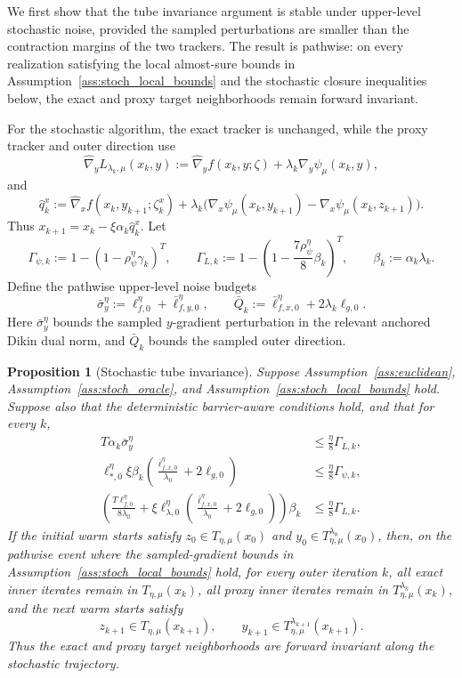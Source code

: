 \documentclass{article}
\newtheorem{proposition}{Proposition}
\begin{document}
We first show that the tube invariance argument is stable under upper-level stochastic noise, provided
the sampled perturbations are smaller than the contraction margins of the two trackers. The result is
pathwise: on every realization satisfying the local almost-sure bounds in
Assumption~\ref{ass:stoch_local_bounds} and the stochastic closure inequalities below, the exact and
proxy target neighborhoods remain forward invariant.

For the stochastic algorithm, the exact tracker is unchanged, while the proxy tracker and outer
direction use
\[
\widehat\nabla_y L_{\lambda_k,\mu}(x_k,y)
:=
\widehat\nabla_y f(x_k,y;\zeta)
+
\lambda_k\nabla_y\psi_\mu(x_k,y),
\]
and
\[
\widehat q_k^x
:=
\widehat\nabla_x f(x_k,y_{k+1};\zeta_k^x)
+
\lambda_k
\bigl(
\nabla_x\psi_\mu(x_k,y_{k+1})
-
\nabla_x\psi_\mu(x_k,z_{k+1})
\bigr).
\]
Thus \(x_{k+1}=x_k-\xi\alpha_k\widehat q_k^x\). Let
\[
\Gamma_{\psi,k}
:=
1-(1-\rho_\psi^\eta\gamma_k)^T,
\qquad
\Gamma_{L,k}
:=
1-\left(1-\frac{7\rho_\psi^\eta}{8}\beta_k\right)^T,
\qquad
\beta_k:=\alpha_k\lambda_k .
\]
Define the pathwise upper-level noise budgets
\[
\bar\sigma_{y}^{\eta}
:=
\ell_{f,0}^{\eta}+\bar\ell_{f,y,0}^{\eta},
\qquad
\bar Q_k
:=
\bar\ell_{f,x,0}^{\eta}+2\lambda_k\ell_{g,0}.
\]
Here \(\bar\sigma_y^\eta\) bounds the sampled \(y\)-gradient perturbation in the relevant anchored
Dikin dual norm, and \(\bar Q_k\) bounds the sampled outer direction.

\begin{proposition}[Stochastic tube invariance]
\label{prop:stoch_tube_maintenance}
Suppose Assumption~\ref{ass:euclidean}, Assumption~\ref{ass:stoch_oracle}, and
Assumption~\ref{ass:stoch_local_bounds} hold. Suppose also that the deterministic
\textit{barrier-aware} conditions hold, and that for every \(k\),
\begin{align}
T\alpha_k\bar\sigma_y^\eta
&\le
\frac{\eta}{8}\Gamma_{L,k},
\label{eq:stoch_proxy_inner_closure}\\
\ell_{*,0}^{\eta}\xi\beta_k
\left(\frac{\bar\ell_{f,x,0}^{\eta}}{\lambda_0}+2\ell_{g,0}\right)
&\le
\frac{\eta}{8}\Gamma_{\psi,k},
\label{eq:stoch_exact_center_closure}\\
\left(
\frac{T\ell_{f,0}^{\eta}}{8\lambda_0}
+
\xi\ell_{\lambda,0}^{\eta}
\left(\frac{\bar\ell_{f,x,0}^{\eta}}{\lambda_0}+2\ell_{g,0}\right)
\right)\beta_k
&\le
\frac{\eta}{8}\Gamma_{L,k}.
\label{eq:stoch_proxy_center_closure}
\end{align}
If the initial warm starts satisfy
\(z_0\in T_{\eta,\mu}(x_0)\) and
\(y_0\in T_{\eta,\mu}^{\lambda_0}(x_0)\), then, on the pathwise event where the sampled-gradient
bounds in Assumption~\ref{ass:stoch_local_bounds} hold, for every outer iteration \(k\), all exact
inner iterates remain in \(T_{\eta,\mu}(x_k)\), all proxy inner iterates remain in
\(T_{\eta,\mu}^{\lambda_k}(x_k)\), and the next warm starts satisfy
\[
z_{k+1}\in T_{\eta,\mu}(x_{k+1}),
\qquad
y_{k+1}\in T_{\eta,\mu}^{\lambda_{k+1}}(x_{k+1}).
\]
Thus the exact and proxy target neighborhoods are forward invariant along the stochastic trajectory.
\end{proposition}
\end{document}

